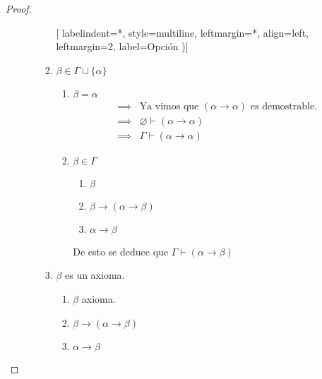 \begin{proof}
\begin{itemize}
\begin{itemize}
                    \begin{enumerate}[%
                                    labelindent=*,
                                    style=multiline,
                                    leftmargin=*,
                                    align=left,
                                    leftmargin=2\parindent,
                                    label=Opción \arabic*)]
                        \item $\beta \in \Gamma\cup \{ \alpha \}$
                            
                        \begin{enumerate}[%
                                        labelindent=*,
                                        style=multiline,
                                        leftmargin=*,
                                        align=left,
                                        leftmargin=2\parindent,
                                        label=Caso \arabic*)]
                        \item $\beta=\alpha$
                        \begin{align*}
                            \implies& \text{Ya vimos que } (\alpha\to\alpha)
                            \text{ es demostrable.} \\
                            \implies& \varnothing\vdash(\alpha\to\alpha)\\
                            \implies& \Gamma\vdash(\alpha\to\alpha)
                        \end{align*}

                        \item $\beta \in \Gamma$

                        \begin{enumerate}
                            \item $\beta$ %
                            \item $\beta\to(\alpha\to\beta)$%
                            \item $\alpha\to\beta$
                        \end{enumerate}

                        De esto se deduce que $\Gamma\vdash(\alpha\to\beta)$
                        \end{enumerate}

                        \item $\beta$ es un axioma.
                        \begin{enumerate}
                            \item $\beta$ axioma.
                            \item $\beta \to (\alpha\to\beta)$
                            \item $\alpha \to \beta$
                        \end{enumerate}


\end{enumerate}
\end{itemize}
\end{itemize}
\end{proof}
